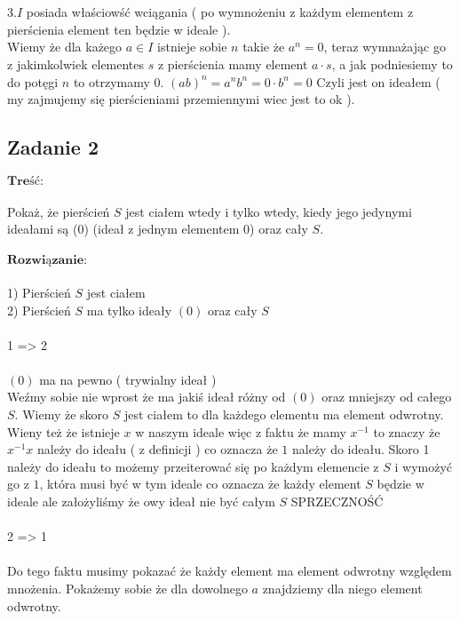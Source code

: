 \\ \\
3.$I$ posiada właściowść wciągania ( po wymnożeniu z każdym elementem z pierścienia element ten będzie w ideale ).
\\
Wiemy że dla każego $a \in I$ istnieje sobie $n$ takie że $a^{n} = 0$, teraz wymnażając go z jakimkolwiek elementes $s$ z pierścienia mamy element $a\cdot s$, a jak podniesiemy to do potęgi $n$ to otrzymamy $0$. $(ab)^n = a^{n}b^{n} = 0\cdot b^{n} = 0$ Czyli jest on ideałem ( my zajmujemy się pierścieniami przemiennymi wiec jest to ok ).



\subsection{Zadanie 2}
$\textbf{Treść:}$ \\ \\
Pokaż, że pierścień $S$ jest ciałem wtedy i tylko wtedy, kiedy jego jedynymi
ideałami są (0) (ideał z jednym elementem 0) oraz cały $S$.
\\
\\
 $\textbf{Rozwiązanie:}$ \\
 \\
 1) Pierścień $S$ jest ciałem \\
 2) Pierścień $S$ ma tylko ideały $(0)$ oraz cały $S$ \\
 \\
 1 => 2 \\ \\
 $(0)$ ma na pewno ( trywialny ideał ) \\
 Weźmy sobie nie wprost że ma jakiś ideał różny od $(0)$ oraz mniejszy od całego $S$. Wiemy że skoro $S$ jest ciałem to dla każdego elementu ma element odwrotny. Wieny też że istnieje $x$ w naszym ideale więc z faktu że mamy $x^{-1}$ to znaczy że $x^{-1}x$ należy do ideału ( z definicji ) co oznacza że $1$ należy do ideału. Skoro 1 należy do ideału to możemy przeiterować się po każdym elemencie z $S$ i wymożyć go z $1$, która musi być w tym ideale co oznacza że każdy element $S$ będzie w ideale ale założyliśmy że owy ideał nie być całym $S$ SPRZECZNOŚĆ \\ 
 \\
 2 => 1 \\ \\
Do tego faktu musimy pokazać że każdy element ma element odwrotny względem mnożenia. Pokażemy sobie że dla dowolnego $a$ znajdziemy dla niego element odwrotny. \\ \\
